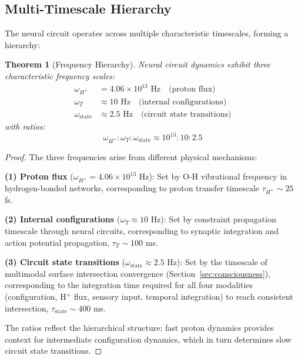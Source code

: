 \documentclass[aps,prd,twocolumn,superscriptaddress,floatfix,nofootinbib]{revtex4-2}
\newtheorem{theorem}{Theorem}[section]
\theoremstyle{remark}
\begin{document}
\subsection{Multi-Timescale Hierarchy}

The neural circuit operates across multiple characteristic timescales, forming a hierarchy:

\begin{theorem}[Frequency Hierarchy]
\label{thm:freq_hierarchy}
Neural circuit dynamics exhibit three characteristic frequency scales:
\begin{align}
\omega_{H^+} &= 4.06 \times 10^{13} \text{ Hz} \quad \text{(proton flux)} \\
\omega_T &\approx 10 \text{ Hz} \quad \text{(internal configurations)} \\
\omega_{\text{state}} &\approx 2.5 \text{ Hz} \quad \text{(circuit state transitions)}
\end{align}
with ratios:
\begin{equation}
\omega_{H^+} : \omega_T : \omega_{\text{state}} \approx 10^{13} : 10 : 2.5
\end{equation}
\end{theorem}

\begin{proof}
The three frequencies arise from different physical mechanisms:

\textbf{(1) Proton flux} ($\omega_{H^+} = 4.06 \times 10^{13}$ Hz): Set by O-H vibrational frequency in hydrogen-bonded networks, corresponding to proton transfer timescale $\tau_{H^+} \sim 25$ fs.

\textbf{(2) Internal configurations} ($\omega_T \approx 10$ Hz): Set by constraint propagation timescale through neural circuits, corresponding to synaptic integration and action potential propagation, $\tau_T \sim 100$ ms.

\textbf{(3) Circuit state transitions} ($\omega_{\text{state}} \approx 2.5$ Hz): Set by the timescale of multimodal surface intersection convergence (Section~\ref{sec:consciousness}), corresponding to the integration time required for all four modalities (configuration, H$^+$ flux, sensory input, temporal integration) to reach consistent intersection, $\tau_{\text{state}} \sim 400$ ms.

The ratios reflect the hierarchical structure: fast proton dynamics provides context for intermediate configuration dynamics, which in turn determines slow circuit state transitions.
\end{proof}
\end{document}
